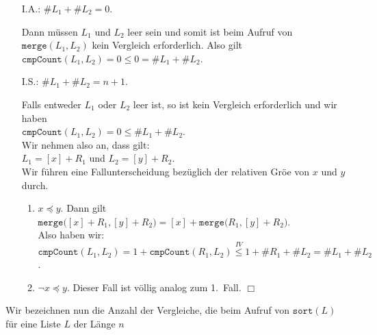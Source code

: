 \begin{enumerate}
\item[I.A.:] $\#L_1 + \#L_2=0$.

             Dann m\"ussen $L_1$ und $L_2$ leer sein und somit ist beim Aufruf
             von $\mathtt{merge}(L_1, L_2)$ kein Vergleich erforderlich.  Also gilt \\[0.1cm]
             \hspace*{1.3cm} $\mathtt{cmpCount}(L_1, L_2) = 0 \leq 0 = \#L_1 + \#L_2$.
\item[I.S.:] $\#L_1 + \#L_2 = n+1$.

             Falls entweder $L_1$ oder $L_2$ leer ist, so ist kein Vergleich erforderlich
             und wir haben 
             \\[0.1cm]
             \hspace*{1.3cm}
             $\mathtt{cmpCount}(L_1,L_2) = 0 \leq \#L_1 + \#L_2$.
             \\[0.1cm]
             Wir nehmen also an, dass gilt: \\[0.1cm]
             \hspace*{1.3cm} $L_1 = [x] + R_1$ \quad und \quad $L_2 = [y] + R_2$.
             \\[0.1cm]
             Wir f\"uhren eine Fallunterscheidung bez\"uglich der relativen Gr\"o\3e von $x$ und $y$ 
             durch.
             \begin{enumerate}
             \item $x \preceq y$.  Dann gilt \\[0.1cm]
                   \hspace*{1.3cm} 
                   $\mathtt{merge}\bigl([x] + R_1, [y] + R_2\bigr) = [x] +
                   \mathtt{merge}\bigl(R_1, [y] + R_2\bigr)$. \\[0.1cm]
                   Also haben wir: \\[0.1cm]
                   \hspace*{1.3cm} 
                   $\mathtt{cmpCount}(L_1, L_2) = 1 + \mathtt{cmpCount}(R_1, L_2) \stackrel{IV}{\leq} 1 + \#R_1 + \#L_2 = \#L_1 + \#L_2$.
             \item $\neg x \preceq y$.  Dieser Fall ist v\"ollig analog zum 1.~Fall. \hspace*{\fill} $\Box$
             \end{enumerate}
\end{enumerate}
Wir bezeichnen nun die Anzahl der Vergleiche, die beim Aufruf von
$\mathtt{sort}(L)$ f\"ur eine Liste $L$ der L\"ange $n$
